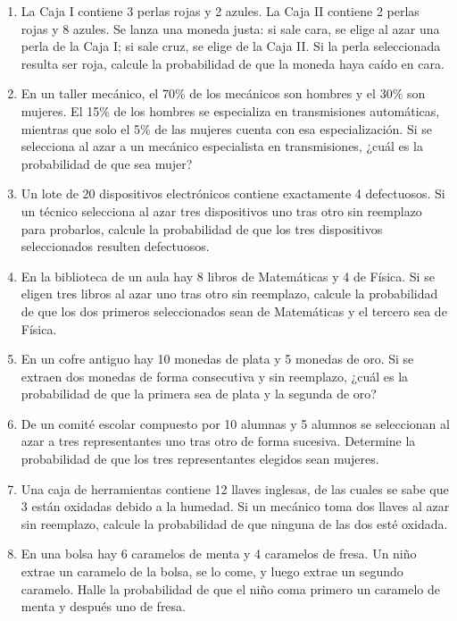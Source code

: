 \documentclass[letterpaper,11pt,spanish]{article}
\begin{document}
\begin{enumerate}
    
    \item La Caja I contiene 3 perlas rojas y 2 azules. La Caja II contiene 2 perlas rojas y 8 azules. Se lanza una moneda justa: si sale cara, se elige al azar una perla de la Caja I; si sale cruz, se elige de la Caja II. Si la perla seleccionada resulta ser roja, calcule la probabilidad de que la moneda haya caído en cara.
    
  
    
    \item En un taller mecánico, el 70\% de los mecánicos son hombres y el 30\% son mujeres. El 15\% de los hombres se especializa en transmisiones automáticas, mientras que solo el 5\% de las mujeres cuenta con esa especialización. Si se selecciona al azar a un mecánico especialista en transmisiones, ¿cuál es la probabilidad de que sea mujer?
    
    
    
    \item Un lote de 20 dispositivos electrónicos contiene exactamente 4 defectuosos. Si un técnico selecciona al azar tres dispositivos uno tras otro sin reemplazo para probarlos, calcule la probabilidad de que los tres dispositivos seleccionados resulten defectuosos.
    
    \item En la biblioteca de un aula hay 8 libros de Matemáticas y 4 de Física. Si se eligen tres libros al azar uno tras otro sin reemplazo, calcule la probabilidad de que los dos primeros seleccionados sean de Matemáticas y el tercero sea de Física.
    
    \item En un cofre antiguo hay 10 monedas de plata y 5 monedas de oro. Si se extraen dos monedas de forma consecutiva y sin reemplazo, ¿cuál es la probabilidad de que la primera sea de plata y la segunda de oro?
    
    \item De un comité escolar compuesto por 10 alumnas y 5 alumnos se seleccionan al azar a tres representantes uno tras otro de forma sucesiva. Determine la probabilidad de que los tres representantes elegidos sean mujeres.
    
    \item Una caja de herramientas contiene 12 llaves inglesas, de las cuales se sabe que 3 están oxidadas debido a la humedad. Si un mecánico toma dos llaves al azar sin reemplazo, calcule la probabilidad de que ninguna de las dos esté oxidada.
    
    \item En una bolsa hay 6 caramelos de menta y 4 caramelos de fresa. Un niño extrae un caramelo de la bolsa, se lo come, y luego extrae un segundo caramelo. Halle la probabilidad de que el niño coma primero un caramelo de menta y después uno de fresa.
    

\end{enumerate}
\end{document}
